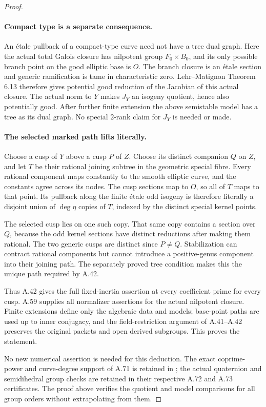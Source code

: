 \begin{proof}
\paragraph{Compact type is a separate consequence.}
An \'{e}tale pullback of a compact-type curve need not
have a tree dual graph. Here the actual total Galois
closure has nilpotent group \(F_0\times B_0\), and its
only possible branch point on the good elliptic base is
\(O\). The branch closure is an \'{e}tale section and
generic ramification is tame in characteristic zero.
Lehr--Matignon Theorem 6.13 therefore gives potential
good reduction of the Jacobian of this actual closure.
\cite{fghLehrMatignon2005}
The actual norm to \(Y\) makes \(J_Y\) an isogeny
quotient, hence also potentially good. After further
finite extension the above semistable model has a tree
as its dual graph. No special \(2\)-rank claim for
\(J_Y\) is needed or made.

\paragraph{The selected marked path lifts literally.}
Choose a cusp of \(Y\) above a cusp \(P\) of \(Z\).
Choose its distinct companion \(Q\) on \(Z\), and
let \(T\) be their rational joining subtree in the
geometric special fibre. Every rational component maps
constantly to the smooth elliptic curve, and the
constants agree across its nodes. The cusp sections
map to \(O\), so all of \(T\) maps to that point.
Its pullback along the finite \'{e}tale odd isogeny is
therefore literally a disjoint union of \(\deg\eta\)
copies of \(T\), indexed by the distinct special
kernel points.

The selected cusp lies on one such copy. That same copy
contains a section over \(Q\), because the odd kernel
sections have distinct reductions after making them
rational. The two generic cusps are distinct since
\(P\ne Q\). Stabilization can contract rational
components but cannot introduce a positive-genus
component into their joining path. The separately
proved tree condition makes this the unique path
required by A.42.

Thus A.42 gives the full fixed-inertia assertion at
every coefficient prime for every cusp. A.59 supplies
all normalizer assertions for the actual nilpotent
closure. Finite extensions define only the algebraic
data and models; base-point paths are used up to inner
conjugacy, and the field-restriction argument of
A.41--A.42 preserves the original packets and open
derived subgroups. This proves the statement.

No new numerical assertion is needed for this deduction.
The exact coprime-power and curve-degree support of
A.71 is retained in
; the actual
quaternion and semidihedral group checks are retained
in their respective A.72 and A.73 certificates. The
proof above verifies the quotient and model comparisons
for all group orders without extrapolating from them.
\end{proof}
